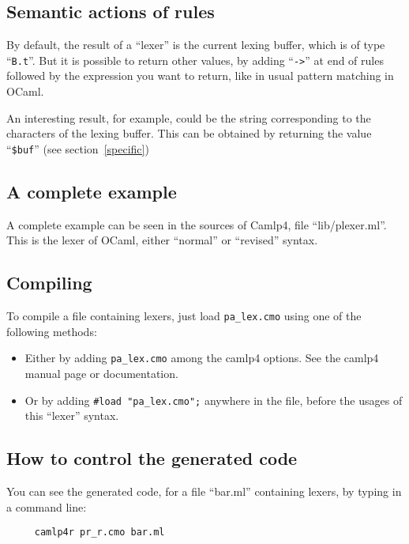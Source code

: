 \documentclass[11pt]{article}
\begin{document}
\subsection{Semantic actions of rules}

By default, the result of a ``lexer'' is the current lexing buffer,
which is of type ``\verb/B.t/''. But it is possible to return other
values, by adding ``\verb/->/'' at end of rules followed by the
expression you want to return, like in usual pattern matching in
OCaml.

An interesting result, for example, could be the string corresponding
to the characters of the lexing buffer. This can be obtained by
returning the value ``\verb/$buf/'' (see section~\ref{specific})

\subsection{A complete example}

A complete example can be seen in the sources of Camlp4, file
``lib/plexer.ml''. This is the lexer of OCaml, either ``normal'' or
``revised'' syntax.

\subsection{Compiling}

To compile a file containing lexers, just load \verb/pa_lex.cmo/ using
one of the following methods:

\begin{itemize}

\item Either by adding \verb/pa_lex.cmo/ among the camlp4 options. See
  the camlp4 manual page or documentation.
\item Or by adding \verb/#load "pa_lex.cmo";/ anywhere in the file,
  before the usages of this ``lexer'' syntax.

\end{itemize}

\subsection{How to control the generated code}

You can see the generated code, for a file ``bar.ml'' containing
lexers, by typing in a command line:

\begin{verbatim}
     camlp4r pr_r.cmo bar.ml
\end{verbatim}
\end{document}
